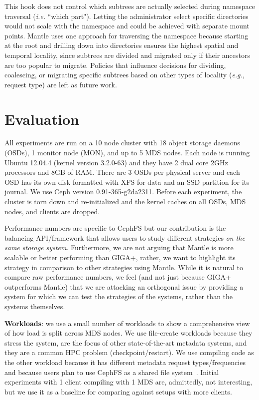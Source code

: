 This hook does not control which subtrees are actually selected during namespace traversal ({\it i.e.} ``which part"). Letting the administrator select specific directories would not scale with the namespace and could be achieved with separate mount points. Mantle uses one approach for traversing the namespace because starting at the root and drilling down into directories ensures the highest spatial and temporal locality, since subtrees are divided and migrated only if their ancestors are too popular to migrate. Policies that influence decisions for dividing, coalescing, or migrating specific subtrees based on other types of locality ({\it e.g.,} request type) are left as future work.

\section{Evaluation}									%
\label{evaluation}										%
All experiments are run on a 10 node cluster with 18 object storage daemons (OSDs), 1 monitor node (MON), and up to 5 MDS nodes. Each node is running Ubuntu 12.04.4 (kernel version 3.2.0-63) and they have 2 dual core 2GHz processors and 8GB of RAM. There are 3 OSDs per physical server and each OSD has its own disk formatted with XFS for data and an SSD partition for its journal. We use Ceph version 0.91-365-g2da2311. Before each experiment, the cluster is torn down and re-initialized and the kernel caches on all OSDs, MDS nodes, and clients are dropped. 

Performance numbers are specific to CephFS but our contribution is the balancing API/framework that allows users to study different strategies {\it on the same storage system}.  Furthermore, we are not arguing that Mantle is more scalable or better performing than GIGA+, rather, we want to highlight its strategy in comparison to other strategies using Mantle. While it is natural to compare raw performance numbers, we feel (and not just because GIGA+ outperforms Mantle) that we are attacking an orthogonal issue by providing a system for which we can test the strategies of the systems, rather than the systems themselves. 

\textbf{Workloads}: we use a small number of workloads to show a comprehensive view of how load is split across MDS nodes. We use file-create workloads because they stress the system, are the focus of other state-of-the-art metadata systems, and they are a common HPC problem (checkpoint/restart). We use compiling code as the other workload because it has different metadata request types/frequencies and because users plan to use CephFS as a shared file system~\cite{website:ceph-cephfs-product-release}. Initial experiments with 1 client compiling with 1 MDS are, admittedly, not interesting, but we use it as a baseline for comparing against setups with more clients. 

